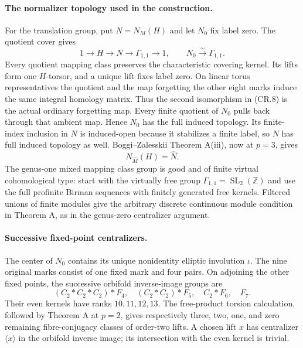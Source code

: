 \paragraph{The normalizer topology used in the construction.}
For the translation group, put $N=N_M(H)$ and let $N_0$ fix label zero.
The quotient cover gives
\[
 1\longrightarrow H\longrightarrow N\longrightarrow\Gamma_{1,1}
       \longrightarrow1,
 \qquad N_0\xrightarrow{\sim}\Gamma_{1,1}.
                                                               \tag{CR.8}
\]
Every quotient mapping class preserves the characteristic covering
kernel.  Its lifts form one $H$-torsor, and a unique lift fixes label
zero.  On linear torus representatives the quotient and the map
forgetting the other eight marks induce the same integral homology
matrix.  Thus the second isomorphism in (CR.8) is the actual ordinary
forgetting map.  Every finite quotient of $N_0$ pulls back through
that ambient map.  Hence $N_0$ has the full induced topology.
Its finite-index inclusion in $N$ is induced-open because it
stabilizes a finite label, so $N$ has full induced topology as well.
Boggi--Zalesskii Theorem A(iii), now at $p=3$, gives
\[
                        N_{\widehat M}(H)=\widehat N.           \tag{CR.9}
\]
The genus-one mixed mapping class group is good and of finite virtual
cohomological type: start with the virtually free group
$\Gamma_{1,1}=\operatorname{SL}_2(\mathbb Z)$ and use the full
profinite Birman sequences with finitely generated free kernels.
Filtered unions of finite modules give the arbitrary discrete
continuous module condition in Theorem A, as in the genus-zero
centralizer argument.

\paragraph{Successive fixed-point centralizers.}
The center of $N_0$ contains its unique nonidentity elliptic
involution $\iota$.  The nine original marks consist of one fixed
mark and four pairs.  On adjoining the other fixed points, the
successive orbifold inverse-image groups are
\[
 (C_2*C_2*C_2)*F_4,\quad (C_2*C_2)*F_5,\quad C_2*F_6,\quad F_7.
                                                               \tag{CR.10}
\]
Their even kernels have ranks $10,11,12,13$.  The free-product torsion
calculation, followed by Theorem A at $p=2$, gives respectively
three, two, one, and zero remaining fibre-conjugacy classes of
order-two lifts.  A chosen lift $x$ has centralizer $\langle x\rangle$
in the orbifold inverse image; its intersection with the even kernel
is trivial.

